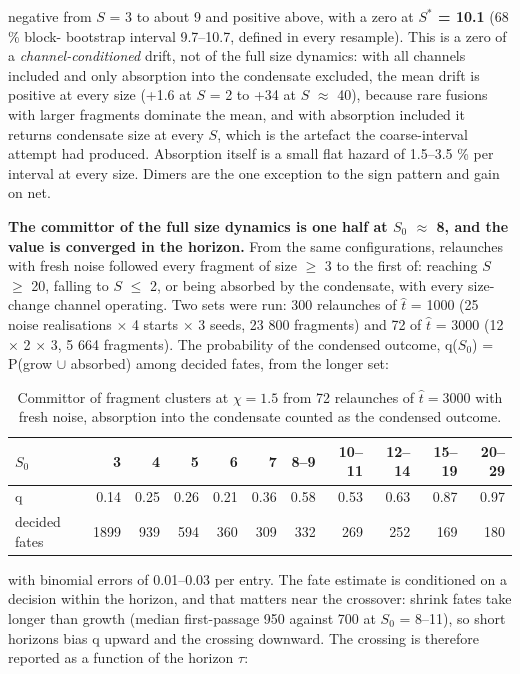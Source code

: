 \documentclass[aps,pre,preprint,superscriptaddress,nofootinbib,longbibliography]{revtex4-2}
\begin{document}
negative from $S$ = 3 to about 9 and positive above, with a zero at \textbf{$S^*$ = 10.1} (68 \% block- bootstrap interval 9.7--10.7, defined in every resample). This is a zero of a \emph{channel-conditioned} drift, not of the full size dynamics: with all channels included and only absorption into the condensate excluded, the mean drift is positive at every size (+1.6 at $S$ = 2 to +34 at $S$ $\approx$ 40), because rare fusions with larger fragments dominate the mean, and with absorption included it returns condensate size at every $S$, which is the artefact the coarse-interval attempt had produced. Absorption itself is a small flat hazard of 1.5--3.5 \% per interval at every size. Dimers are the one exception to the sign pattern and gain on net.

\textbf{The committor of the full size dynamics is one half at $S_0$ $\approx$ 8, and the value is converged in the horizon.} From the same configurations, relaunches with fresh noise followed every fragment of size $\ge$ 3 to the first of: reaching $S$ $\ge$ 20, falling to $S$ $\le$ 2, or being absorbed by the condensate, with every size-change channel operating. Two sets were run: 300 relaunches of $\hat{t}$ = 1000 (25 noise realisations $\times$ 4 starts $\times$ 3 seeds, 23 800 fragments) and 72 of $\hat{t}$ = 3000 (12 $\times$ 2 $\times$ 3, 5 664 fragments). The probability of the condensed outcome, q($S_0$) = P(grow $\cup$ absorbed) among decided fates, from the longer set:

\begin{table}[htbp]
\caption{Committor of fragment clusters at $\chi=1.5$ from 72 relaunches of $\hat t=3000$ with fresh noise, absorption into the condensate counted as the condensed outcome.}
\label{tab:10}
\begin{ruledtabular}
\begin{tabular}{lrrrrrrrrrr}
$S_0$ & 3 & 4 & 5 & 6 & 7 & 8--9 & 10--11 & 12--14 & 15--19 & 20--29 \\
\hline
q & 0.14 & 0.25 & 0.26 & 0.21 & 0.36 & 0.58 & 0.53 & 0.63 & 0.87 & 0.97 \\
decided fates & 1899 & 939 & 594 & 360 & 309 & 332 & 269 & 252 & 169 & 180 \\
\end{tabular}
\end{ruledtabular}
\end{table}

with binomial errors of 0.01--0.03 per entry. The fate estimate is conditioned on a decision within the horizon, and that matters near the crossover: shrink fates take longer than growth (median first-passage 950 against 700 at $S_0$ = 8--11), so short horizons bias q upward and the crossing downward. The crossing is therefore reported as a function of the horizon $\tau$:
\end{document}

